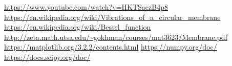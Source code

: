 \documentclass[10pt]{SelfArx} %
\begin{document}


\begin{thebibliography}{9}
\bibitem{}
\label{batuque}
\url{https://www.youtube.com/watch?v=HKTSaezB4p8}
\url{https://en.wikipedia.org/wiki/Vibrations\_of\_a\_circular\_membrane}
\bibitem{}
\url{https://en.wikipedia.org/wiki/Bessel_function}
\bibitem{} 
\url{http://zeta.math.utsa.edu/~gokhman/courses/mat3623/Membrane.pdf}
\bibitem{}
\url{https://matplotlib.org/3.2.2/contents.html}
\bibitem{}
\url{https://numpy.org/doc/}
\bibitem{}
\url{https://docs.scipy.org/doc/}

\end{thebibliography}
\end{document}
